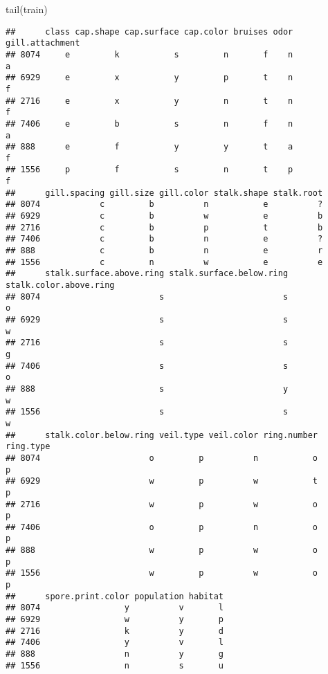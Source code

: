 \documentclass[
]{article}
\newenvironment{Shaded}{\begin{snugshade}}{\end{snugshade}}
\newcommand{\FunctionTok}[1]{\textcolor[rgb]{0.00,0.00,0.00}{#1}}
\newcommand{\NormalTok}[1]{#1}
\begin{document}
\begin{Shaded}
\begin{Highlighting}[]
\FunctionTok{tail}\NormalTok{(train)}
\end{Highlighting}
\end{Shaded}

\begin{verbatim}
##      class cap.shape cap.surface cap.color bruises odor gill.attachment
## 8074     e         k           s         n       f    n               a
## 6929     e         x           y         p       t    n               f
## 2716     e         x           y         n       t    n               f
## 7406     e         b           s         n       f    n               a
## 888      e         f           y         y       t    a               f
## 1556     p         f           s         n       t    p               f
##      gill.spacing gill.size gill.color stalk.shape stalk.root
## 8074            c         b          n           e          ?
## 6929            c         b          w           e          b
## 2716            c         b          p           t          b
## 7406            c         b          n           e          ?
## 888             c         b          n           e          r
## 1556            c         n          w           e          e
##      stalk.surface.above.ring stalk.surface.below.ring stalk.color.above.ring
## 8074                        s                        s                      o
## 6929                        s                        s                      w
## 2716                        s                        s                      g
## 7406                        s                        s                      o
## 888                         s                        y                      w
## 1556                        s                        s                      w
##      stalk.color.below.ring veil.type veil.color ring.number ring.type
## 8074                      o         p          n           o         p
## 6929                      w         p          w           t         p
## 2716                      w         p          w           o         p
## 7406                      o         p          n           o         p
## 888                       w         p          w           o         p
## 1556                      w         p          w           o         p
##      spore.print.color population habitat
## 8074                 y          v       l
## 6929                 w          y       p
## 2716                 k          y       d
## 7406                 y          v       l
## 888                  n          y       g
## 1556                 n          s       u
\end{verbatim}
\end{document}
